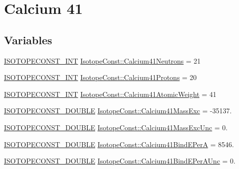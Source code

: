 \hypertarget{group___isotope_const-_calcium-_ca41}{}\section{Calcium 41}
\label{group___isotope_const-_calcium-_ca41}
\subsection*{Variables}
\begin{DoxyCompactItemize}
\item 
\mbox{\hyperlink{group___isotope_const-_macros_ga5f18360b3e99483a35c32d789e62621c}{I\+S\+O\+T\+O\+P\+E\+C\+O\+N\+S\+T\+\_\+\+I\+NT}} \mbox{\hyperlink{group___isotope_const-_calcium-_ca41_ga2e46dc9def7c1f95c7fa0bf29cf703b0}{Isotope\+Const\+::\+Calcium41\+Neutrons}} = 21
\item 
\mbox{\hyperlink{group___isotope_const-_macros_ga5f18360b3e99483a35c32d789e62621c}{I\+S\+O\+T\+O\+P\+E\+C\+O\+N\+S\+T\+\_\+\+I\+NT}} \mbox{\hyperlink{group___isotope_const-_calcium-_ca41_ga21e86b0b83a37a0050ec6ecc4320045e}{Isotope\+Const\+::\+Calcium41\+Protons}} = 20
\item 
\mbox{\hyperlink{group___isotope_const-_macros_ga5f18360b3e99483a35c32d789e62621c}{I\+S\+O\+T\+O\+P\+E\+C\+O\+N\+S\+T\+\_\+\+I\+NT}} \mbox{\hyperlink{group___isotope_const-_calcium-_ca41_gaae3ecc363e8c6f67dbcbed502c0ca846}{Isotope\+Const\+::\+Calcium41\+Atomic\+Weight}} = 41
\item 
\mbox{\hyperlink{group___isotope_const-_macros_ga8f45a7272ce02c0b4c65c44636ed719a}{I\+S\+O\+T\+O\+P\+E\+C\+O\+N\+S\+T\+\_\+\+D\+O\+U\+B\+LE}} \mbox{\hyperlink{group___isotope_const-_calcium-_ca41_ga0cc48ba7de3977cf6b448126d8994f39}{Isotope\+Const\+::\+Calcium41\+Mass\+Exc}} = -\/35137.
\item 
\mbox{\hyperlink{group___isotope_const-_macros_ga8f45a7272ce02c0b4c65c44636ed719a}{I\+S\+O\+T\+O\+P\+E\+C\+O\+N\+S\+T\+\_\+\+D\+O\+U\+B\+LE}} \mbox{\hyperlink{group___isotope_const-_calcium-_ca41_ga58d11d3fddd83362f35f5ce206f40cfe}{Isotope\+Const\+::\+Calcium41\+Mass\+Exc\+Unc}} = 0.
\item 
\mbox{\hyperlink{group___isotope_const-_macros_ga8f45a7272ce02c0b4c65c44636ed719a}{I\+S\+O\+T\+O\+P\+E\+C\+O\+N\+S\+T\+\_\+\+D\+O\+U\+B\+LE}} \mbox{\hyperlink{group___isotope_const-_calcium-_ca41_gabe5e98dd7c499c97761f8a2cbbdee1d8}{Isotope\+Const\+::\+Calcium41\+Bind\+E\+PerA}} = 8546.
\item 
\mbox{\hyperlink{group___isotope_const-_macros_ga8f45a7272ce02c0b4c65c44636ed719a}{I\+S\+O\+T\+O\+P\+E\+C\+O\+N\+S\+T\+\_\+\+D\+O\+U\+B\+LE}} \mbox{\hyperlink{group___isotope_const-_calcium-_ca41_gaf215abbeabc06cf19bdf73a1425b06fe}{Isotope\+Const\+::\+Calcium41\+Bind\+E\+Per\+A\+Unc}} = 0.

\end{DoxyCompactItemize}
